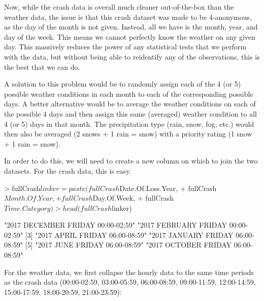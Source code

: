 \documentclass[11pt, a4paper]{article}
\begin{document}
Now, while the crash data is overall much cleaner out-of-the-box than the weather data, the issue is that this crash dataset was made to be 4-anonymous, as the day of the month is not given. Instead, all we have is the month, year, and day of the week. This means we cannot perfectly know the weather on any given day. This massively reduces the power of any statistical tests that we perform with the data, but without being able to reidentify any of the observations, this is the best that we can do. 
\par
A solution to this problem would be to randomly assign each of the 4 (or 5) possible weather conditions in each month to each of the corresponding possible days. A better alternative would be to average the weather conditions on each of the possible 4 days and then assign this same (averaged) weather condition to all 4 (or 5) days in that month. The precipitation type (rain, snow, fog, etc.) would then also be averaged (2 snows + 1 rain = snow) with a priority rating (1 snow + 1 rain = snow). 
\par
In order to do this, we will need to create a new column on which to join the two datasets. For the crash data, this is easy. 

\begin{Schunk}
\begin{Sinput}
> fullCrash$linker = paste(fullCrash$Date.Of.Loss.Year,
+                          fullCrash$Month.Of.Year, 
+                          fullCrash$Day.Of.Week,
+                          fullCrash$Time.Category)
> head(fullCrash$linker)
\end{Sinput}
\begin{Soutput}
[1] "2017 DECEMBER FRIDAY 00:00-02:59" "2017 FEBRUARY FRIDAY 00:00-02:59"
[3] "2017 APRIL FRIDAY 06:00-08:59"    "2017 JANUARY FRIDAY 06:00-08:59" 
[5] "2017 JUNE FRIDAY 06:00-08:59"     "2017 OCTOBER FRIDAY 06:00-08:59" 
\end{Soutput}
\end{Schunk}


For the weather data, we first collapse the hourly data to the same time periods as the crash data (00:00-02:59, 03:00-05:59, 06:00-08:59, 09:00-11:59, 12:00-14:59, 15:00-17:59, 18:00-20:59, 21:00-23:59):

\begin{Schunk}
\end{Schunk}
\end{document}
